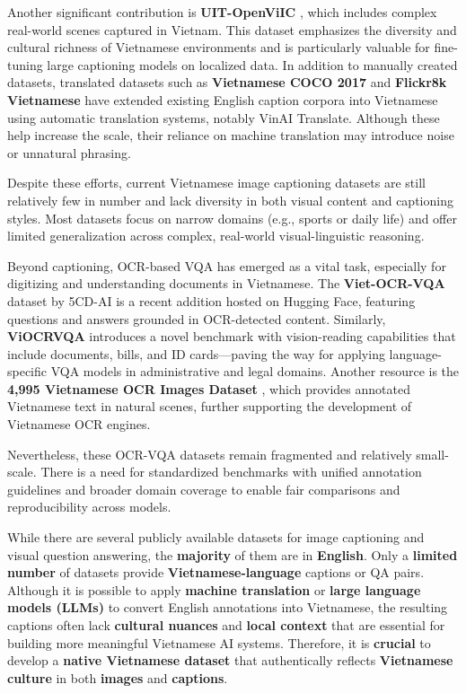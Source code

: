 \documentclass[conference]{IEEEtran}
\begin{document}
Another significant contribution is \textbf{UIT-OpenViIC} \cite{bui2023uitopenviic}, which includes complex real-world scenes captured in Vietnam. This dataset emphasizes the diversity and cultural richness of Vietnamese environments and is particularly valuable for fine-tuning large captioning models on localized data. In addition to manually created datasets, translated datasets such as \textbf{Vietnamese COCO 2017} \cite{dinhanhx_VisualRoBERTa_2022} and \textbf{Flickr8k Vietnamese} have extended existing English caption corpora into Vietnamese using automatic translation systems, notably VinAI Translate. Although these help increase the scale, their reliance on machine translation may introduce noise or unnatural phrasing.

Despite these efforts, current Vietnamese image captioning datasets are still relatively few in number and lack diversity in both visual content and captioning styles. Most datasets focus on narrow domains (e.g., sports or daily life) and offer limited generalization across complex, real-world visual-linguistic reasoning.

Beyond captioning, OCR-based VQA has emerged as a vital task, especially for digitizing and understanding documents in Vietnamese. The \textbf{Viet-OCR-VQA} dataset by 5CD-AI \cite{doan2024vintern1befficientmultimodallarge} is a recent addition hosted on Hugging Face, featuring questions and answers grounded in OCR-detected content. Similarly, \textbf{ViOCRVQA} \cite{pham2024viocrvqa} introduces a novel benchmark with vision-reading capabilities that include documents, bills, and ID cards—paving the way for applying language-specific VQA models in administrative and legal domains. Another resource is the \textbf{4,995 Vietnamese OCR Images Dataset} \cite{nexdata2024vietnameseocr}, which provides annotated Vietnamese text in natural scenes, further supporting the development of Vietnamese OCR engines.

Nevertheless, these OCR-VQA datasets remain fragmented and relatively small-scale. There is a need for standardized benchmarks with unified annotation guidelines and broader domain coverage to enable fair comparisons and reproducibility across models.

\noindent While there are several publicly available datasets for image captioning and visual question answering, the \textbf{majority} of them are in \textbf{English}. Only a \textbf{limited number} of datasets provide \textbf{Vietnamese-language} captions or QA pairs. Although it is possible to apply \textbf{machine translation} or \textbf{large language models (LLMs)} to convert English annotations into Vietnamese, the resulting captions often lack \textbf{cultural nuances} and \textbf{local context} that are essential for building more meaningful Vietnamese AI systems. Therefore, it is \textbf{crucial} to develop a \textbf{native Vietnamese dataset} that authentically reflects \textbf{Vietnamese culture} in both \textbf{images} and \textbf{captions}.
\end{document}
